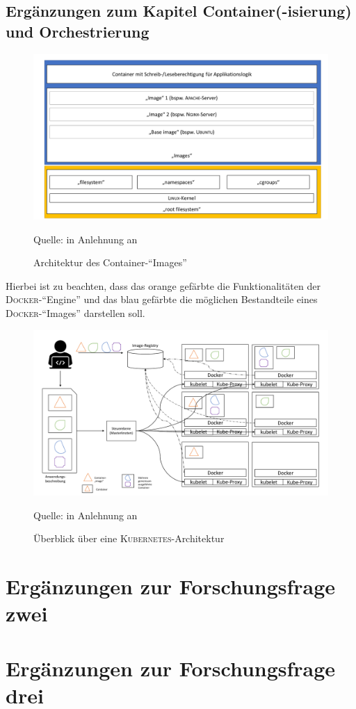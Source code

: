 \section{Ergänzungen zum Kapitel Container(-isierung) und Orchestrierung}

\begin{figure}[H]
	\centering
	\includegraphics[scale=0.45]{img/containerImageArch.pdf}
	\caption{Architektur des Container-\enquote{Images}}
	{\footnotesize Quelle: in Anlehnung an \cite{pahl_containerization_2015}}
	\label{abb:containerArch}
\end{figure}

Hierbei ist zu beachten, dass das orange gefärbte die Funktionalitäten der \textsc{Docker}-\enquote{Engine} und das blau gefärbte die möglichen Bestandteile eines \textsc{Docker}-\enquote{Images} darstellen soll.


\begin{figure}[H]
	\centering
	\includegraphics[scale=0.46]{img/k8sArch.pdf}
	\caption{Überblick über eine \textsc{Kubernetes}-Architektur}
	{\footnotesize Quelle: in Anlehnung an \cite[][S.23]{luksa_kubernetes_2018}}
	\label{abb:k8sArch}
\end{figure}

\chapter{Ergänzungen zur Forschungsfrage zwei} \label{appendixFF2}



\chapter{Ergänzungen zur Forschungsfrage drei} \label{appendixFF3}


